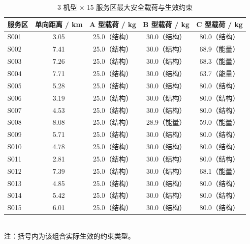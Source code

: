 \begin{table}[htbp]
\caption{3 机型 $\times$ 15 服务区最大安全载荷与生效约束}
\label{tab:q1_payload}
\centering
{}
\setlength{\tabcolsep}{4pt}
\begin{tabular}{lcccc}
\toprule
服务区 & 单向距离 / km & A 型载荷 / kg & B 型载荷 / kg & C 型载荷 / kg \\
\midrule
S001 & 3.05 & 25.0（结构） & 30.0（结构） & 80.0（结构） \\
S002 & 7.41 & 25.0（结构） & 30.0（结构） & 68.9（能量） \\
S003 & 7.26 & 25.0（结构） & 30.0（结构） & 68.3（能量） \\
S004 & 7.71 & 25.0（结构） & 30.0（结构） & 63.7（能量） \\
S005 & 5.28 & 25.0（结构） & 30.0（结构） & 80.0（结构） \\
S006 & 3.19 & 25.0（结构） & 30.0（结构） & 80.0（结构） \\
S007 & 4.53 & 25.0（结构） & 30.0（结构） & 80.0（结构） \\
S008 & 8.08 & 25.0（结构） & 28.9（能量） & 59.0（能量） \\
S009 & 5.71 & 25.0（结构） & 30.0（结构） & 80.0（结构） \\
S010 & 4.78 & 25.0（结构） & 30.0（结构） & 80.0（结构） \\
S011 & 2.81 & 25.0（结构） & 30.0（结构） & 80.0（结构） \\
S012 & 7.39 & 25.0（结构） & 30.0（结构） & 68.1（能量） \\
S013 & 4.85 & 25.0（结构） & 30.0（结构） & 80.0（结构） \\
S014 & 5.42 & 25.0（结构） & 30.0（结构） & 80.0（结构） \\
S015 & 6.01 & 25.0（结构） & 30.0（结构） & 80.0（结构） \\
\bottomrule
\end{tabular}
\\[2pt] \footnotesize 注：括号内为该组合实际生效的约束类型。
\end{table}
